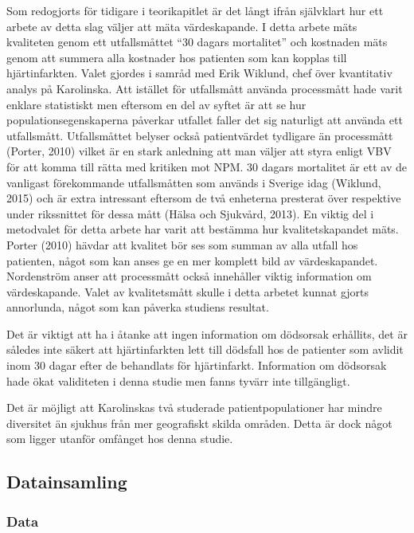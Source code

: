 Som redogjorts för tidigare i teorikapitlet är det långt ifrån självklart hur ett arbete av detta slag väljer att mäta värdeskapande. I detta arbete mäts kvaliteten genom ett utfallsmåttet “30 dagars mortalitet” och kostnaden mäts genom att summera alla kostnader hos patienten som kan kopplas till hjärtinfarkten. Valet gjordes i samråd med Erik Wiklund, chef över kvantitativ analys på Karolinska. Att istället för utfallsmått använda processmått hade varit enklare statistiskt men eftersom en del av syftet är att se hur populationsegenskaperna påverkar utfallet faller det sig naturligt att använda ett utfallsmått. Utfallsmåttet belyser också patientvärdet tydligare än processmått (Porter, 2010) vilket är en stark anledning att man väljer att styra enligt VBV för att komma till rätta med kritiken mot NPM. 30 dagars mortalitet är ett av de vanligast förekommande utfallsmåtten som används i Sverige idag (Wiklund, 2015) och är extra intressant eftersom de två enheterna presterat över respektive under rikssnittet för dessa mått (Hälsa och Sjukvård, 2013). En viktig del i metodvalet för detta arbete har varit att bestämma hur kvalitetskapandet mäts. Porter (2010) hävdar att kvalitet bör ses som summan av alla utfall hos patienten, något som kan anses ge en mer komplett bild av värdeskapandet. Nordenström anser att processmått också innehåller viktig information om värdeskapande. Valet av kvalitetsmått skulle i detta arbetet kunnat gjorts annorlunda, något som kan påverka studiens resultat.

Det är viktigt att ha i åtanke att ingen information om dödsorsak erhållits, det är således inte säkert att hjärtinfarkten lett till dödsfall hos de patienter som avlidit inom 30 dagar efter de behandlats för hjärtinfarkt. Information om dödsorsak hade ökat validiteten i denna studie men fanns tyvärr inte tillgängligt.

Det är möjligt att Karolinskas två studerade patientpopulationer har mindre diversitet än sjukhus från mer geografiskt skilda områden. Detta är dock något som ligger utanför omfånget hos denna studie.

\subsection{Datainsamling}

\subsubsection{Data}

